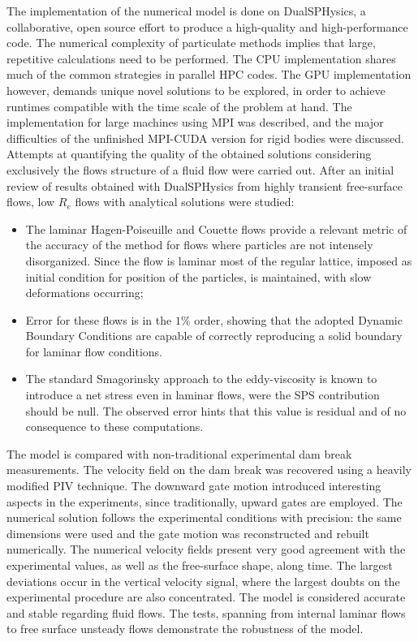 The implementation of the numerical model is done on DualSPHysics, a collaborative, open source effort to produce a high-quality and high-performance code. The numerical complexity of particulate methods implies that large, repetitive calculations need to be performed. The \ac{CPU} implementation shares much of the common strategies in parallel \ac{HPC} codes. The \ac{GPU} implementation however, demands unique novel solutions to be explored, in order to achieve runtimes compatible with the time scale of the problem at hand. The implementation for large machines using \ac{MPI} was described, and the major difficulties of the unfinished \ac{MPI}-\ac{CUDA} version for rigid bodies were discussed. \\


Attempts at quantifying the quality of the obtained solutions considering exclusively the flows structure of a fluid flow were carried out. After an initial review of results obtained with DualSPHysics from highly transient free-surface flows, low $R_e$ flows with analytical solutions were studied:

\begin{itemize}
\item The laminar Hagen-Poiseuille and Couette flows provide a relevant metric of the accuracy of the method for flows where particles are not intensely disorganized. Since the flow is laminar most of the regular lattice, imposed as initial condition for position of the particles, is maintained, with slow deformations occurring;
\item Error for these flows is in the $1\%$ order, showing that the adopted Dynamic Boundary Conditions are capable of correctly reproducing a solid boundary for laminar flow conditions.
\item The standard Smagorinsky approach to the eddy-viscosity is known to introduce a net stress even in laminar flows, were the \ac{SPS} contribution should be null. The observed error hints that this value is residual and of no consequence to these computations.
\end{itemize}

The model is compared with non-traditional experimental dam break measurements. The velocity field on the dam break was recovered using a heavily modified \ac{PIV} technique. The downward gate motion introduced interesting aspects in the experiments, since traditionally, upward gates are employed. The numerical solution follows the experimental conditions with precision: the same dimensions were used and the gate motion was reconstructed and rebuilt numerically. The numerical velocity fields present very good agreement with the experimental values, as well as the free-surface shape, along time. The largest deviations occur in the vertical velocity signal, where the largest doubts on the experimental procedure are also concentrated.
The model is considered accurate and stable regarding fluid flows. The tests, spanning from internal laminar flows to free surface unsteady flows demonstrate the robustness of the model.\\


